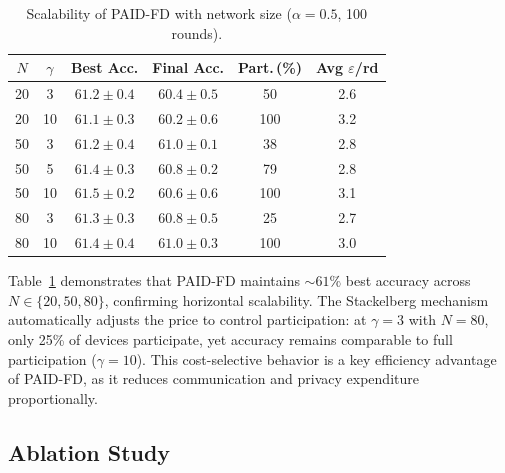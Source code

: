 \begin{table}[t]
\centering
\caption{Scalability of PAID-FD with network size ($\alpha = 0.5$, 100 rounds).}
\label{tab:scalability}
\begin{tabular}{cccccc}
\toprule
$N$ & $\gamma$ & Best Acc. & Final Acc. & Part.\,(\%) & Avg $\varepsilon$/rd \\
\midrule
20  & 3  & $61.2 \pm 0.4$ & $60.4 \pm 0.5$ & 50  & 2.6  \\
20  & 10 & $61.1 \pm 0.3$ & $60.2 \pm 0.6$ & 100 & 3.2  \\
50  & 3  & $61.2 \pm 0.4$ & $61.0 \pm 0.1$ & 38  & 2.8  \\
50  & 5  & $61.4 \pm 0.3$ & $60.8 \pm 0.2$ & 79  & 2.8  \\
50  & 10 & $61.5 \pm 0.2$ & $60.6 \pm 0.6$ & 100 & 3.1  \\
80  & 3  & $61.3 \pm 0.3$ & $60.8 \pm 0.5$ & 25  & 2.7  \\
80  & 10 & $61.4 \pm 0.4$ & $61.0 \pm 0.3$ & 100 & 3.0  \\
\bottomrule
\end{tabular}
\end{table}

Table~\ref{tab:scalability} demonstrates that PAID-FD maintains
$\sim\!61\%$ best accuracy across $N \in \{20, 50, 80\}$,
confirming horizontal scalability.
The Stackelberg mechanism automatically adjusts the price to control
participation: at $\gamma = 3$ with $N = 80$, only 25\% of devices
participate, yet accuracy remains comparable to full participation
($\gamma = 10$).
This cost-selective behavior is a key efficiency advantage of PAID-FD,
as it reduces communication and privacy expenditure proportionally.

\subsection{Ablation Study}\label{sec:ablation}

